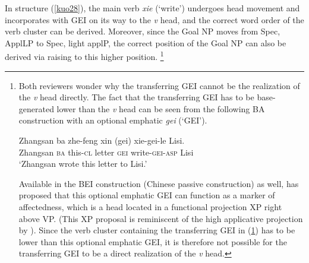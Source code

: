 \documentclass[output=paper,colorlinks,citecolor=brown]{langscibook}
\begin{document}
In structure (\ref{kuo28}), the main verb \textit{xie} (`write') undergoes head movement and incorporates with GEI on its way to the \textit{v} head, and the correct word order of the verb cluster can be derived. Moreover, since the Goal NP moves from Spec, ApplLP to Spec, light applP, the correct position of the Goal NP can also be derived via raising to this higher position.
\footnote{Both reviewers wonder why the transferring GEI cannot be the realization of the
\textit{v} head directly. The fact that the transferring GEI has to be base-generated lower than the \textit{v} head can be seen from the following BA construction with an optional emphatic \textit{gei} (`GEI').

\ea
\label{kuoii}
\gll Zhangsan ba zhe-feng	xin (gei)	xie-gei-le 		Lisi.\\
Zhangsan \textsc{ba} this-\textsc{cl} letter	\textsc{gei}	write-\textsc{gei}-\textsc{asp}	Lisi
\\
\glt `Zhangsan wrote this letter to Lisi.'
\z

Available in the BEI construction (Chinese passive construction) as well, \cite{Tang2001} has proposed that this optional emphatic GEI can function as a marker of affectedness, which is a head located in a functional projection XP right above VP. (This XP proposal is reminiscent of the high applicative projection by \citet{Pylkkanen2002, Pylkkanen2008}). Since the verb cluster containing the transferring GEI in (\ref{kuoii}) has to be lower than this optional emphatic GEI, it is therefore not possible for the transferring GEI to be a direct realization of the \textit{v} head.}
\par

\end{document}
